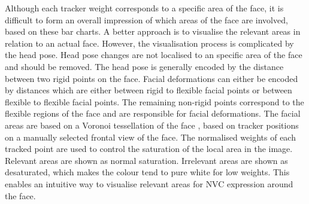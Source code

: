 Although each tracker weight corresponds to a specific area of the face, it is difficult to form an overall impression of which areas of the face are involved, based on these bar charts. A better approach is to visualise the relevant areas in relation to an actual face. However, the visualisation process is complicated by the head pose. 
Head pose changes are not localised to an specific area of the face and should be removed. The head pose is generally encoded by the distance between two rigid points on the face. Facial deformations can either be encoded by distances which are either between rigid to flexible facial points or between flexible to flexible facial points.
The remaining non-rigid points correspond to the flexible regions of the face and are responsible for facial deformations. The facial areas are based on a Voronoi tessellation of the face \cite{Dirichlet1850}, based on tracker positions on a manually selected frontal view of the face. The normalised weights of each tracked point are used to control the saturation of the local area in the image. Relevant areas are shown as normal saturation. Irrelevant areas are shown as desaturated, which makes the colour tend to pure white for low weights. This enables an intuitive way to visualise relevant areas for \ac{NVC} expression around the face.

